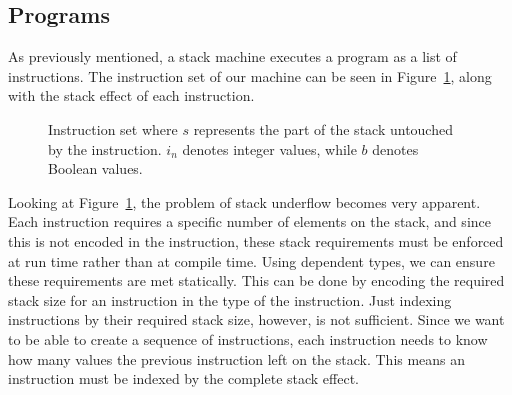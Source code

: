 \subsection{Programs}
\label{sec:program}
As previously mentioned, a stack machine executes a program as a list of instructions. The instruction set of our machine can be seen in Figure~\ref{fig:inst_set}, along with the stack effect of each instruction.

\begin{figure}
\caption{Instruction set where $s$ represents the part of the stack untouched by the instruction. $i_n$ denotes integer values, while $b$ denotes Boolean values.}
\label{fig:inst_set}
\end{figure}

Looking at Figure~\ref{fig:inst_set}, the problem of stack underflow becomes very apparent. Each instruction requires a specific number of elements on the stack, and since this is not encoded in the instruction, these stack requirements must be enforced at run time rather than at compile time. Using dependent types, we can ensure these requirements are met statically. This can be done by encoding the required stack size for an instruction in the type of the instruction. Just indexing instructions by their required stack size, however, is not sufficient. Since we want to be able to create a sequence of instructions, each instruction needs to know how many values the previous instruction left on the stack. This means an instruction must be indexed by the complete stack effect. 

